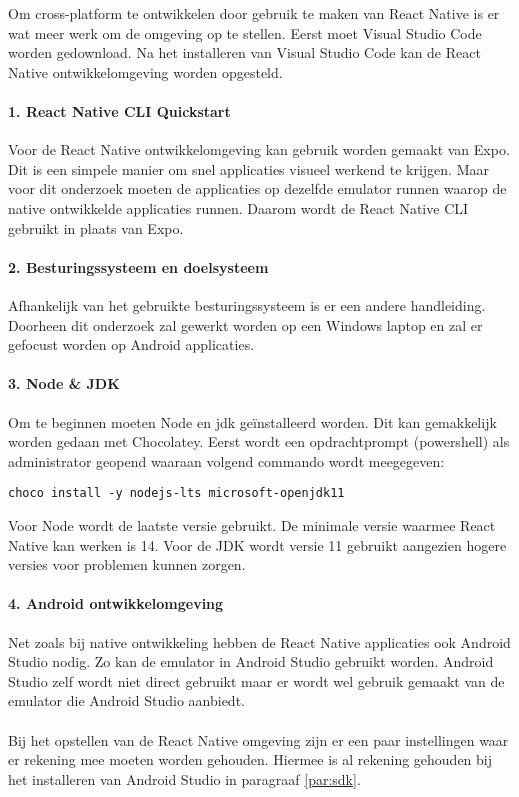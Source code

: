 Om cross-platform te ontwikkelen door gebruik te maken van React Native is er wat meer werk om 
de omgeving op te stellen. Eerst moet Visual Studio Code worden gedownload. 
Na het installeren van Visual Studio Code kan de React Native ontwikkelomgeving worden opgesteld. 

\paragraph{1. React Native CLI Quickstart}
Voor de React Native ontwikkelomgeving kan gebruik worden gemaakt van Expo. 
Dit is een simpele manier om snel applicaties visueel werkend te krijgen. 
Maar voor dit onderzoek moeten de applicaties op dezelfde emulator runnen waarop de native 
ontwikkelde applicaties runnen. Daarom wordt de React Native CLI gebruikt in plaats van Expo.

\paragraph{2. Besturingssysteem en doelsysteem}
Afhankelijk van het gebruikte besturingssysteem is er een andere handleiding. 
Doorheen dit onderzoek zal gewerkt worden op een Windows laptop en zal er gefocust worden op 
Android applicaties.

\paragraph{3. Node \& JDK}
Om te beginnen moeten \Gls{Node} en \acrshort{jdk} geïnstalleerd worden. Dit kan gemakkelijk 
worden gedaan met \Gls{Chocolatey}. Eerst wordt een 
opdrachtprompt (powershell) als administrator geopend waaraan volgend commando wordt meegegeven:
\begin{verbatim}
choco install -y nodejs-lts microsoft-openjdk11
\end{verbatim}
Voor Node wordt de laatste versie gebruikt. De minimale versie waarmee React Native kan werken is 14. 
Voor de JDK wordt versie 11 gebruikt aangezien hogere versies voor problemen kunnen zorgen.

\paragraph{4. Android ontwikkelomgeving}
Net zoals bij native ontwikkeling hebben de React Native applicaties ook Android Studio nodig. 
Zo kan de emulator in Android Studio gebruikt worden. 
Android Studio zelf wordt niet direct gebruikt maar er wordt wel gebruik gemaakt van de 
emulator die Android Studio aanbiedt.
\\\\
Bij het opstellen van de React Native omgeving zijn er een paar instellingen waar er rekening 
mee moeten worden gehouden. Hiermee is al rekening gehouden bij het installeren van Android Studio 
in paragraaf \ref{par:sdk}.


